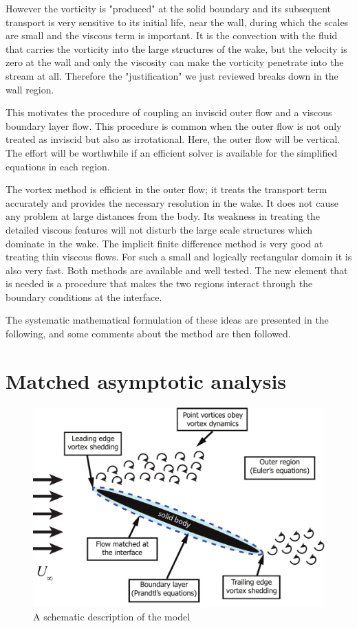 However the vorticity is "produced" at the solid boundary and its subsequent transport is very sensitive to its initial life, near the wall, during which the scales are small and the viscous term is important.
It is the convection with the fluid that carries the vorticity into the large structures of the wake, but the velocity is zero at the wall and only the viscosity can make the vorticity penetrate into the stream at all.
Therefore the "justification" we just reviewed breaks down in the wall region.

This motivates the procedure of coupling an inviscid outer flow and a viscous boundary layer flow.
This procedure is common when the outer flow is not only treated as inviscid but also as irrotational.
Here, the outer flow will be vertical.
The effort will be worthwhile if an efficient solver is available for the simplified equations in each region.

The vortex method is efficient in the outer flow; it treats the transport term accurately and provides the necessary resolution in the wake.
It does not cause any problem at large distances from the body.
Its weakness in treating the detailed viscous features will not disturb the large scale structures which dominate in the wake.
The implicit finite difference method is very good at treating thin viscous flows.
For such a small and logically rectangular domain it is also very fast.
Both methods are available and well tested.
The new element that is needed is a procedure that makes the two regions interact through the boundary conditions at the interface.

The systematic mathematical formulation of these ideas are presented in the following, and some comments about the method are then followed.


\section{Matched asymptotic analysis}

\begin{figure}
 \begin{center}
 \includegraphics[width = 14cm]{./Figures/model/ModelSchematic.pdf}
\end{center}
 \caption{A schematic description of the model}
 \label{fig:modelschematic}
\end{figure}

